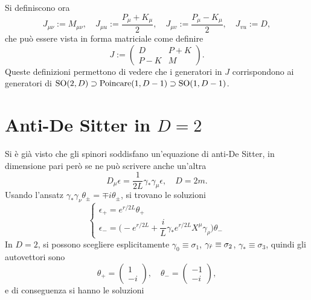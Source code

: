 Si definiscono ora 
\begin{equation}
    J_{\mu\nu} := M_{\mu\nu},\quad J_{\mu u} := \frac{P_\mu + K_\mu}{2},\quad J_{\mu v} := \frac{P_\mu - K_\mu}{2},\quad J_{vu} := D,
\end{equation}
che può essere vista in forma matriciale come definire 
\begin{equation}
    J := 
    \begin{pmatrix}
        D & P + K \\
        P - K & M
    \end{pmatrix}.
\end{equation}
Queste definizioni permettono di vedere che i generatori in $J$ corrispondono ai generatori di $\mathrm{SO}(2,D) \supset \mathrm{Poincare}(1,D - 1) \supset \mathrm{SO}(1,D - 1)$.

\section{Anti-De Sitter in \texorpdfstring{$D = 2$}{D = 2}}
Si è già visto che gli spinori soddisfano un'equazione di anti-De Sitter, in dimensione pari però se ne può scrivere anche un'altra 
\begin{equation}
    D_\mu\epsilon = \frac{1}{2L}\gamma_*\gamma_\mu\epsilon,\quad D = 2m.
\end{equation}
Usando l'ansatz $\gamma_*\gamma_\nu\theta_\pm = \mp i\theta_\pm$, si trovano le soluzioni
\begin{equation}
    \begin{cases}
        \epsilon_+ = e^{r/2L}\theta_+ \\[2ex]
        \epsilon_- = \bigg(-e^{r/2L} + \dfrac{i}{L}\gamma_*e^{r/2L}X^\mu\gamma_\rho\bigg)\theta_-
    \end{cases}
\end{equation}
In $D = 2$, si possono scegliere esplicitamente $\gamma_0 \equiv \sigma_1$, $\gamma_{\hat{r}} \equiv \sigma_2$, $\gamma_* \equiv \sigma_3$, quindi gli autovettori sono 
\begin{equation}
    \theta_+ =
    \begin{pmatrix}
        1 \\
        -i
    \end{pmatrix},\quad 
    \theta_- = 
    \begin{pmatrix}
        -1 \\
        -i
    \end{pmatrix},
\end{equation}
e di conseguenza si hanno le soluzioni

